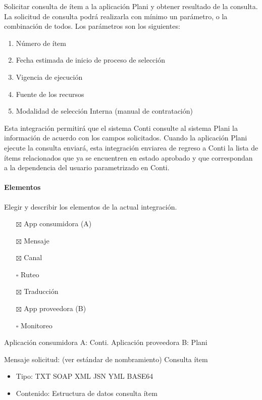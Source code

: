 \documentclass[
  paper=a4,
  ,captions=tableheading
]{scrartcl}
\providecommand{\tightlist}{%
  \setlength{\itemsep}{0pt}\setlength{\parskip}{0pt}}
\begin{document}
Solicitar consulta de ítem a la aplicación Plani y obtener resultado de
la consulta. La solicitud de consulta podrá realizarla con mínimo un
parámetro, o la combinación de todos. Los parámetros son los siguientes:

\begin{enumerate}
\def\labelenumi{\arabic{enumi}.}
\tightlist
\item
  Número de ítem
\item
  Fecha estimada de inicio de proceso de selección
\item
  Vigencia de ejecución
\item
  Fuente de los recursos
\item
  Modalidad de selección Interna (manual de contratación)
\end{enumerate}

Esta integración permitirá que el sistema Conti consulte al sistema
Plani la información de acuerdo con los campos solicitados. Cuando la
aplicación Plani ejecute la consulta enviará, esta integración enviarea
de regreso a Conti la lista de ítems relacionados que ya se encuentren
en estado aprobado y que correspondan a la dependencia del usuario
parametrizado en Conti.

\paragraph{Elementos}\label{sec:elementos-1}

Elegir y describir los elementos de la actual integración.

\begin{itemize}
\tightlist
\item[$\boxtimes$]
  App consumidora (A)
\item[$\boxtimes$]
  Mensaje
\item[$\boxtimes$]
  Canal
\item[$\square$]
  Ruteo
\item[$\boxtimes$]
  Traducción
\item[$\boxtimes$]
  App proveedora (B)
\item[$\square$]
  Monitoreo
\end{itemize}

Aplicación consumidora A: Conti. Aplicación proveedora B: Plani

Mensaje solicitud: (ver estándar de nombramiento) Consulta ítem

\begin{itemize}
\tightlist
\item
  Tipo: TXT \textbar{} SOAP \textbar{} XML \textbar{} JSN \textbar{} YML
  \textbar{} BASE64
\item
  Contenido: Estructura de datos consulta ítem
\end{itemize}
\end{document}
